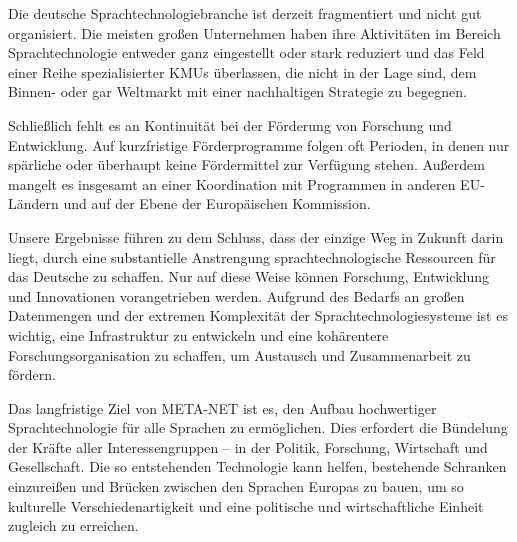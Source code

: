 \documentclass[]{../../metanetpaper}
\begin{document}
\begin{multicols}{2}
Die deutsche Sprachtechnologiebranche ist derzeit fragmentiert und nicht gut organisiert. Die meisten großen Unternehmen haben ihre Aktivitäten im Bereich Sprachtechnologie entweder ganz eingestellt oder stark reduziert und das Feld einer Reihe spezialisierter KMUs überlassen, die nicht in der Lage sind, dem Binnen- oder gar Weltmarkt mit einer nachhaltigen Strategie zu begegnen. 

Schließlich fehlt es an Kontinuität bei der Förderung von Forschung und Entwicklung. Auf kurzfristige Förderprogramme folgen oft Perioden, in denen nur spärliche oder überhaupt keine Fördermittel zur Verfügung stehen. Außerdem mangelt es insgesamt an einer Koordination mit Programmen in anderen EU-Ländern und auf der Ebene der Europäischen Kommission.

Unsere Ergebnisse führen zu dem Schluss, dass der einzige Weg in Zukunft darin liegt, durch eine substantielle Anstrengung sprachtechnologische Ressourcen für das Deutsche zu schaffen. Nur auf diese Weise können Forschung, Entwicklung und Innovationen vorangetrieben werden. Aufgrund des Bedarfs an großen Datenmengen und der extremen Komplexität der Sprachtechnologiesysteme ist es wichtig, eine Infrastruktur zu entwickeln und eine kohärentere Forschungsorganisation zu schaffen, um Austausch und Zusammenarbeit zu fördern.

Das langfristige Ziel von META-NET ist es, den Aufbau hochwertiger Sprachtechnologie für alle Sprachen zu ermöglichen. Dies erfordert die Bündelung der Kräfte aller Interessengruppen -- in der Politik, Forschung, Wirtschaft und Gesellschaft. Die so entstehenden Technologie kann helfen, bestehende Schranken einzureißen und Brücken zwischen den Sprachen Europas zu bauen, um so kulturelle Verschiedenartigkeit und eine politische und wirtschaftliche Einheit zugleich zu erreichen. 
\end{multicols}

\clearpage
\end{document}
